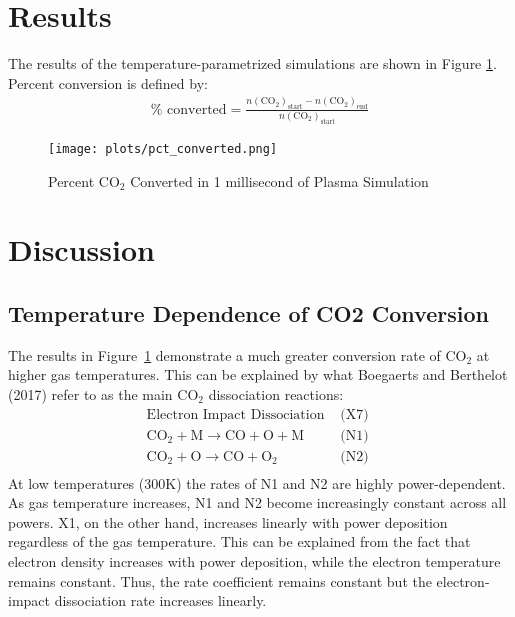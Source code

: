 \documentclass[twocolumn,10pt,a4paper]{article}
\begin{document}
\section{Results}
The results of the temperature-parametrized simulations are shown in Figure \ref{fig: pct}. Percent
conversion is defined by:
\begin{align*}
        \%\text{ converted} = \frac{
            n(\text{CO}_2)_\text{start} - n(\text{CO}_2)_\text{end}
        }
        {
            n(\text{CO}_2)_\text{start}
        }
\end{align*}

\begin{figure}[htbp]
\begin{center}
\texttt{[image: plots/pct\_converted.png]}
\caption{Percent CO$_2$ Converted in 1 millisecond of Plasma Simulation}
\label{fig: pct}
\end{center}
\end{figure}

\section{Discussion}
\subsection{Temperature Dependence of CO2 Conversion}
The results in Figure~\ref{fig: pct} demonstrate a much greater conversion rate of CO$_2$ at higher
gas temperatures. This can be explained by what Boegaerts and Berthelot (2017) refer to as the main CO$_2$ dissociation reactions:
\begin{align*}
        \text{Electron Impact Dissociation} &\text{  (X7)}\\
        \text{CO}_2 + \text{M} \longrightarrow \text{CO} + \text{O} + \text{M} &\text{  (N1)}\\
        \text{CO}_2 + \text{O} \longrightarrow \text{CO} + \text{O}_2   &\text{  (N2) }\\
\end{align*}
At low temperatures (300K) the rates of N1 and N2 are highly power-dependent.
As gas temperature increases, N1 and N2 become increasingly constant across all powers.
X1, on the other hand, increases linearly with power deposition regardless of the gas temperature.
This can be explained from the fact that electron density increases with power deposition, while
the electron temperature remains constant. Thus, the rate coefficient remains constant but the
electron-impact dissociation rate increases linearly.
\end{document}
